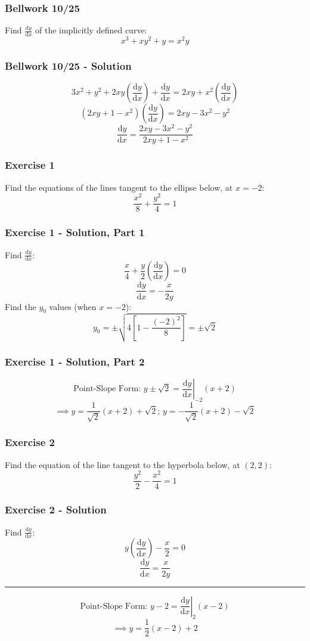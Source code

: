 \documentclass[12pt]{beamer}
\newcommand\at[2]{\left.#1\right|_{#2}}
\begin{document}
\begin{frame}
	\frametitle{Bellwork 10/25}
	\initclock

	\vfill
	\vfill
	\vfill
	\vfill
	\Large
	Find $\frac{\mathrm{d}y}{\mathrm{d}x}$ of the implicitly defined curve:
	\[x^3+xy^2+y=x^2y\]
	\vfill
	\vfill
	\vfill
	\vfill
	\vfill
	\vfill
	\vfill

	\small
	\crono
\end{frame}
\begin{frame}
	\frametitle{Bellwork 10/25 - Solution}

	\large
	\[3x^2+y^2+2xy\left(\frac{\mathrm{d}y}{\mathrm{d}x}\right)+\frac{\mathrm{d}y}{\mathrm{d}x}=2xy+x^2\left(\frac{\mathrm{d}y}{\mathrm{d}x}\right)\]
	\[(2xy+1-x^2)\left(\frac{\mathrm{d}y}{\mathrm{d}x}\right)=2xy-3x^2-y^2\]
	\[\boxed{\frac{\mathrm{d}y}{\mathrm{d}x}=\frac{2xy-3x^2-y^2}{2xy+1-x^2}}\]
\end{frame}
\begin{frame}
	\frametitle{Exercise 1}

	\large
	Find the equations of the lines tangent to the ellipse below, at $x=-2$: \[\frac{x^{2}}{8}+\frac{y^{2}}{4}=1\]
\end{frame}
\begin{frame}
	\frametitle{Exercise 1 - Solution, Part 1}

	Find $\frac{\mathrm{d}y}{\mathrm{d}x}$:
	\[\frac{x}{4}+\frac{y}{2}\left(\frac{\mathrm{d}y}{\mathrm{d}x}\right)=0\]
	\[\frac{\mathrm{d}y}{\mathrm{d}x}=-\frac{x}{2y}\]
	Find the $y_0$ values (when $x=-2$):
	\[y_0=\pm\sqrt{4\left[1-\frac{(-2)^2}{8}\right]}=\pm\sqrt{2}\]
\end{frame}
\begin{frame}
	\frametitle{Exercise 1 - Solution, Part 2}

	\[\text{Point-Slope Form: }y\pm\sqrt{2}=\at{\frac{\mathrm{d}y}{\mathrm{d}x}}{-2}(x+2)\]
	\[\implies \boxed{y=\frac{1}{\sqrt{2}}(x+2)+\sqrt{2}}\text{; }\boxed{y=-\frac{1}{\sqrt{2}}(x+2)-\sqrt{2}}\]
\end{frame}
\begin{frame}
	\frametitle{Exercise 2}

	\large
	Find the equation of the line tangent to the hyperbola below, at $(2, 2)$: \[\frac{y^{2}}{2}-\frac{x^{2}}{4}=1\]
\end{frame}
\begin{frame}
	\frametitle{Exercise 2 - Solution}

	Find $\frac{\mathrm{d}y}{\mathrm{d}x}$:
	\[y\left(\frac{\mathrm{d}y}{\mathrm{d}x}\right)-\frac{x}{2}=0\]
	\[\frac{\mathrm{d}y}{\mathrm{d}x}=\frac{x}{2y}\]
	\vfill
	\hrule
	\vfill
	\[\text{Point-Slope Form: }y-2=\at{\frac{\mathrm{d}y}{\mathrm{d}x}}{2}(x-2)\]
	\[\implies \boxed{y=\frac{1}{2}(x-2)+2}\]
\end{frame}
\end{document}
